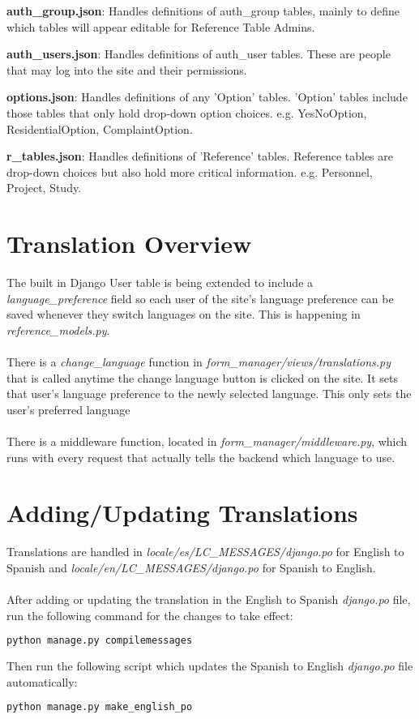 \documentclass{article}
\begin{document}
\textbf{auth\_group.json}: Handles definitions of auth\_group tables, mainly to define which tables will appear editable for Reference Table Admins.

\textbf{auth\_users.json}: Handles definitions of auth\_user tables. These are people that may log into the site and their permissions.

\textbf{options.json}: Handles definitions of any 'Option' tables.  'Option' tables include those tables that only hold drop-down option choices. e.g. YesNoOption, ResidentialOption, ComplaintOption.

\textbf{r\_tables.json}: Handles definitions of 'Reference' tables.  Reference tables are drop-down choices but also hold more critical information.  e.g. Personnel, Project, Study.

\section{Translation Overview}
The built in Django User table is being extended to include a \textit{language\_preference} field so each user of the site's language preference can be saved whenever they switch languages on the site. This is happening in \textit{reference\_models.py}.
\\\\There is a \textit{change\_language} function in \textit{form\_manager/views/translations.py} that is called anytime the change language button is clicked on the site.  It sets that user's language preference to the newly selected language.  This only sets the user's preferred language
\\\\There is a middleware function, located in \textit{form\_manager/middleware.py}, which runs with every request that actually tells the backend which language to use.

\section{Adding/Updating Translations}
Translations are handled in \textit{locale/es/LC\_MESSAGES/django.po} for English to Spanish and \textit{locale/en/LC\_MESSAGES/django.po} for Spanish to English. 
\\\\After adding or updating the translation in the English to Spanish \textit{django.po} file, run the following command for the changes to take effect:
\begin{lstlisting}[language=bash]
  python manage.py compilemessages
\end{lstlisting}
Then run the following script which updates the Spanish to English \textit{django.po} file automatically:
\begin{lstlisting}[language=bash]
  python manage.py make_english_po
\end{lstlisting}
\end{document}
